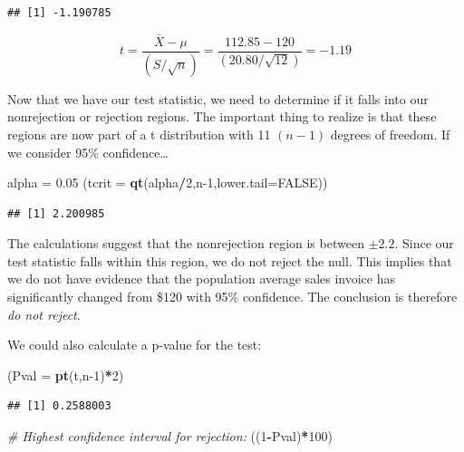 \documentclass[
]{book}
\newenvironment{Shaded}{\begin{snugshade}}{\end{snugshade}}
\newcommand{\AttributeTok}[1]{\textcolor[rgb]{0.13,0.29,0.53}{#1}}
\newcommand{\CommentTok}[1]{\textcolor[rgb]{0.56,0.35,0.01}{\textit{#1}}}
\newcommand{\ConstantTok}[1]{\textcolor[rgb]{0.56,0.35,0.01}{#1}}
\newcommand{\DecValTok}[1]{\textcolor[rgb]{0.00,0.00,0.81}{#1}}
\newcommand{\FloatTok}[1]{\textcolor[rgb]{0.00,0.00,0.81}{#1}}
\newcommand{\FunctionTok}[1]{\textcolor[rgb]{0.13,0.29,0.53}{\textbf{#1}}}
\newcommand{\NormalTok}[1]{#1}
\newcommand{\OtherTok}[1]{\textcolor[rgb]{0.56,0.35,0.01}{#1}}
\newcommand{\SpecialCharTok}[1]{\textcolor[rgb]{0.81,0.36,0.00}{\textbf{#1}}}
\begin{document}
\begin{verbatim}
## [1] -1.190785
\end{verbatim}

\[ t = \frac{\bar{X}-\mu}{\left(S / \sqrt{n} \right)}=\frac{112.85-120}{\left(20.80 / \sqrt{12} \right)}=-1.19\]

Now that we have our test statistic, we need to determine if it falls into our nonrejection or rejection regions. The important thing to realize is that these regions are now part of a t distribution with 11 \((n-1)\) degrees of freedom. If we consider 95\% confidence\ldots{}

\begin{Shaded}
\begin{Highlighting}[]
\NormalTok{alpha }\OtherTok{=} \FloatTok{0.05}
\NormalTok{(}\AttributeTok{tcrit =} \FunctionTok{qt}\NormalTok{(alpha}\SpecialCharTok{/}\DecValTok{2}\NormalTok{,n}\DecValTok{{-}1}\NormalTok{,}\AttributeTok{lower.tail=}\ConstantTok{FALSE}\NormalTok{))}
\end{Highlighting}
\end{Shaded}

\begin{verbatim}
## [1] 2.200985
\end{verbatim}

The calculations suggest that the nonrejection region is between \(\pm 2.2\). Since our test statistic falls within this region, we do not reject the null. This implies that we do not have evidence that the population average sales invoice has significantly changed from \$120 with 95\% confidence. The conclusion is therefore \emph{do not reject}.

We could also calculate a p-value for the test:

\begin{Shaded}
\begin{Highlighting}[]
\NormalTok{(}\AttributeTok{Pval =} \FunctionTok{pt}\NormalTok{(t,n}\DecValTok{{-}1}\NormalTok{)}\SpecialCharTok{*}\DecValTok{2}\NormalTok{)}
\end{Highlighting}
\end{Shaded}

\begin{verbatim}
## [1] 0.2588003
\end{verbatim}

\begin{Shaded}
\begin{Highlighting}[]
\CommentTok{\# Highest confidence interval for rejection:}
\NormalTok{((}\DecValTok{1}\SpecialCharTok{{-}}\NormalTok{Pval)}\SpecialCharTok{*}\DecValTok{100}\NormalTok{)}
\end{Highlighting}
\end{Shaded}
\end{document}
